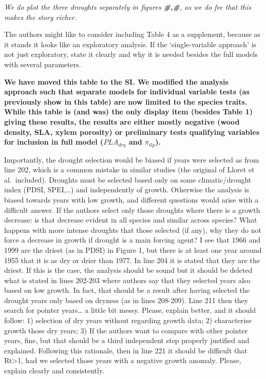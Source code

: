 \documentclass[
]{article}
\begin{document}
\emph{We do plot the three droughts separately in figures
\textbf{\#,\#}, as we do fee that this makes the story richer.}

The authors might like to consider including Table 4 as a supplement,
because as it stands it looks like an exploratory analysis. If the
`single-variable approach' is not just exploratory, state it clearly and
why it is needed besides the full models with several parameters.

\textbf{We have moved this table to the SI. We modified the analysis
approach such that separate models for individual variable tests (as
previously show in this table) are now limited to the species traits.
While this table is (and was) the only display item (besides Table 1)
giving these results, the results are either mostly negative (wood
density, SLA, xylem porosity) or preliminary tests qualifying variables
for inclusion in full model (\(PLA_{dry}\) and \(\pi_{tlp}\)).}

Importantly, the drought selection would be biased if years were
selected as from line 202, which is a common mistake in similar studies
(the original of Lloret et al.~included). Droughts must be selected
based only on some climatic/drought index (PDSI, SPEI,\ldots) and
independently of growth. Otherwise the analysis is biased towards years
with low growth, and different questions would arise with a difficult
answer. If the authors select only those droughts where there is a
growth decrease: is that decrease evident in all species and similar
across species? What happens with more intense droughts that those
selected (if any), why they do not force a decrease in growth if drought
is a main forcing agent? I see that 1966 and 1999 are the driest (as in
PDSI) in Figure 1, but there is at least one year around 1955 that it is
as dry or drier than 1977. In line 204 it is stated that they are the
driest. If this is the case, the analysis should be sound but it should
be deleted what is stated in lines 202-203 where authors say that they
selected years also based on low growth. In fact, that should be a
result after having selected the drought years only based on dryness (as
in lines 208-209). Line 211 then they search for pointer years\ldots{} a
little bit messy. Please, explain better, and it should follow: 1)
selection of dry years without regarding growth data; 2) characterise
growth those dry years; 3) If the authors want to compare with other
pointer years, fine, but that should be a third independent step
properly justified and explained. Following this rationale, then in line
221 it should be difficult that Rt\textgreater1, had we selected those
years with a negative growth anomaly. Please, explain clearly and
consistently.
\end{document}
